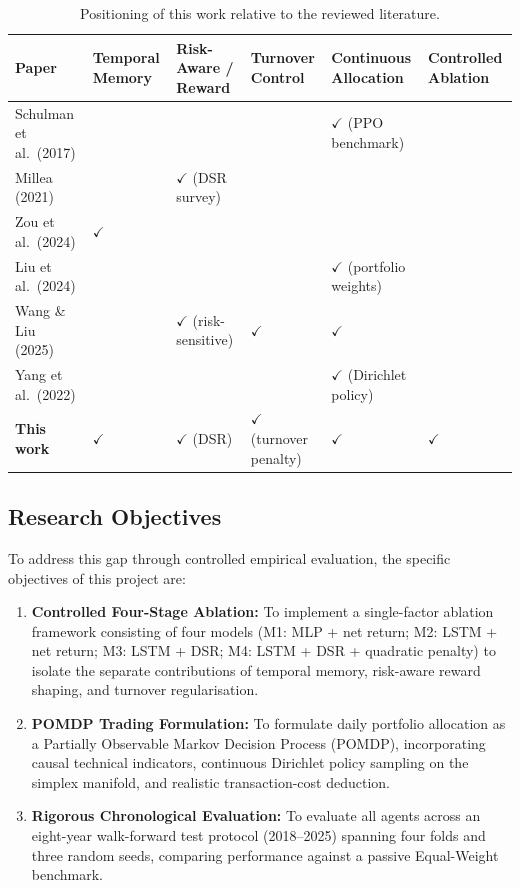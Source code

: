 \documentclass[11pt,a4paper]{article}
\numberwithin{equation}{section}
\numberwithin{table}{section}
\numberwithin{figure}{section}
\numberwithin{algorithm}{section}
\begin{document}
\begin{table}[!htbp]
\centering\small
\caption{Positioning of this work relative to the reviewed literature.}\label{tab:gap}
\begin{tabular}{@{}p{3.3cm}p{1.6cm}p{2.5cm}p{1.9cm}p{2.5cm}p{1.9cm}@{}}
\toprule
Paper & Temporal Memory & Risk-Aware / Reward & Turnover Control & Continuous Allocation & Controlled Ablation\\
\midrule
Schulman et al.\ (2017) \cite{schulman2017} & & & & $\checkmark$ (PPO benchmark) & \\
Millea (2021) \cite{millea2021} & & $\checkmark$ (DSR survey) & & & \\
Zou et al.\ (2024) \cite{zou2024} & $\checkmark$ & & & & \\
Liu et al.\ (2024) \cite{liu2024} & & & & $\checkmark$ (portfolio weights) & \\
Wang \& Liu (2025) \cite{wang2025} & & $\checkmark$ (risk-sensitive) & $\checkmark$ & $\checkmark$ & \\
Yang et al.\ (2022) \cite{yang2022} & & & & $\checkmark$ (Dirichlet policy) & \\
\midrule
\textbf{This work} & $\checkmark$ & $\checkmark$ (DSR) & $\checkmark$ (turnover penalty) & $\checkmark$ & $\checkmark$\\
\bottomrule
\end{tabular}
\end{table}

\subsection{Research Objectives}
To address this gap through controlled empirical evaluation, the specific objectives of this project are:
\begin{enumerate}
\item \textbf{Controlled Four-Stage Ablation:} To implement a single-factor ablation framework consisting of four models (M1: MLP + net return; M2: LSTM + net return; M3: LSTM + DSR; M4: LSTM + DSR + quadratic penalty) to isolate the separate contributions of temporal memory, risk-aware reward shaping, and turnover regularisation.
\item \textbf{POMDP Trading Formulation:} To formulate daily portfolio allocation as a Partially Observable Markov Decision Process (POMDP), incorporating causal technical indicators, continuous Dirichlet policy sampling on the simplex manifold, and realistic transaction-cost deduction.
\item \textbf{Rigorous Chronological Evaluation:} To evaluate all agents across an eight-year walk-forward test protocol (2018--2025) spanning four folds and three random seeds, comparing performance against a passive Equal-Weight benchmark.
\end{enumerate}
\end{document}
